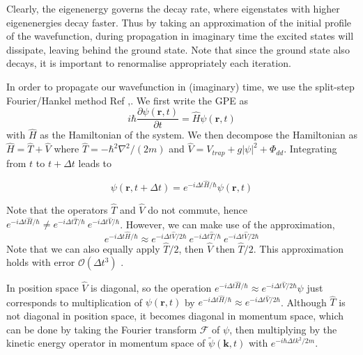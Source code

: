 \documentclass[10pt]{article}
\numberwithin{equation}{section}
\begin{document}
\begin{multicols}{2}
Clearly, the eigenenergy governs the decay rate, where eigenstates with higher eigenenergies decay faster. Thus by taking an approximation of the initial profile of the wavefunction, during propagation in imaginary time the excited states will dissipate, leaving behind the ground state. Note that since the ground state also decays, it is important to renormalise appropriately each iteration.

In order to propagate our wavefunction in (imaginary) time, we use the split-step Fourier/Hankel method Ref \cite{4451240},\cite{TAHA1984231}. We first write the GPE as
\begin{equation}
i\hbar \frac{\partial \psi(\textbf{r},t)}{\partial t}=\hat{H} \psi(\textbf{r},t)
\end{equation}
with $\hat{H}$ as the Hamiltonian of the system. We then decompose the Hamiltonian as $\hat{H} = \hat{T} + \hat{V}$ where $\hat{T} = -\hbar^2 \nabla^2 /(2m)$ and $\hat{V} = V_{trap} + g|\psi|^2 + \Phi_{dd}$. Integrating from $t$ to $t + \Delta t$ leads to

\begin{equation}
\psi(\textbf{r},t+\Delta t) = e^{-i \Delta t \hat{H} /\hbar}\psi(\textbf{r},t)
\end{equation}

Note that the operators $\hat{T}$ and $\hat{V}$ do not commute, hence $e^{-i \Delta t \hat{H} /\hbar} \neq e^{-i \Delta t \hat{T} /\hbar} \ e^{-i \Delta t \hat{V} /\hbar}$. However, we can make use of the approximation, 
\begin{equation}
e^{-i \Delta t \hat{H} /\hbar} \approx e^{-i \Delta t \hat{V} /2\hbar} \ e^{-i \Delta t \hat{T} /\hbar} \ e^{-i \Delta t \hat{V} /2\hbar}
\end{equation}
Note that we can also equally apply $\hat{T}/2$, then $\hat{V}$ then $\hat{T}/2$. This approximation holds with error $\mathcal{O}(\Delta t^3)$ \cite{LIU20091435}.

In position space $\hat{V}$ is diagonal, so the operation $e^{-i \Delta t \hat{H} /\hbar} \approx e^{-i \Delta t \hat{V} /2\hbar} \psi$ just corresponds to multiplication of $\psi(\textbf{r},t)$ by $e^{-i \Delta t \hat{H} /\hbar} \approx e^{-i \Delta t \hat{V} /2\hbar}$. Although $\hat{T}$ is not diagonal in position space, it becomes diagonal in momentum space, which can be done by taking the Fourier transform $\mathcal{F}$ of $\psi$, then multiplying by the kinetic energy operator in momentum space of $\tilde{\psi}(\textbf{k},t)$ with $e^{-i \hbar \Delta t k^2 /2m}$.


\end{multicols}
\end{document}
